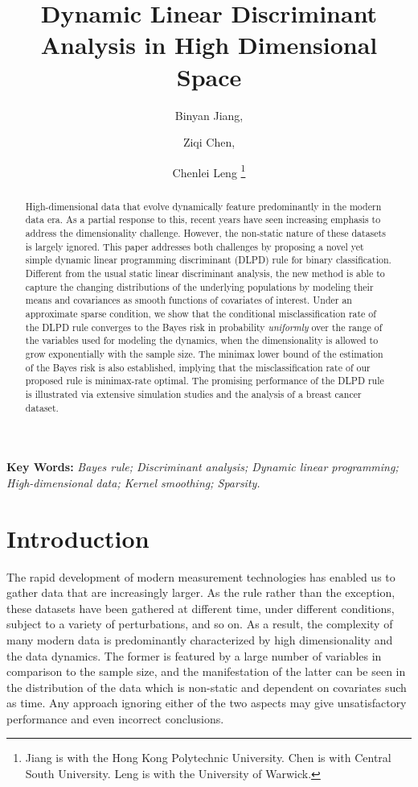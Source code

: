 \documentclass[11pt]{article}
\title{Dynamic Linear Discriminant Analysis in High Dimensional Space}
\author{Binyan Jiang, \and Ziqi Chen, \and Chenlei Leng
  \footnote{Jiang is with the Hong Kong Polytechnic University. Chen is with Central South University. Leng is with
    the University of Warwick. %
    }
}
\theoremstyle{definition}
\def\vv{1}
\renewcommand{\baselinestretch}{\vv}
\begin{document}
 \renewcommand{\baselinestretch}{1.2}

\maketitle

\begin{abstract}
High-dimensional data that evolve dynamically feature predominantly in the modern data era.  As a partial response to this,
recent years have seen increasing emphasis to
address the dimensionality challenge. However, the non-static nature of these datasets is largely
ignored. This paper addresses both challenges by proposing a novel yet simple dynamic linear
programming discriminant (DLPD) rule for binary classification. Different from the usual static linear discriminant analysis, the new method is able to capture the changing distributions of the underlying populations by modeling their means and covariances as smooth functions of covariates of interest. Under an approximate sparse condition, we show that the conditional misclassification rate of the DLPD rule converges to the Bayes risk in probability {\it uniformly} over the range of the variables used for modeling the dynamics, when the dimensionality is allowed to grow exponentially with the sample size. The minimax lower bound of the estimation of the Bayes risk is also established, implying that the misclassification rate of our proposed rule is minimax-rate optimal. The promising performance of the DLPD rule is illustrated via extensive simulation studies and the analysis of a breast cancer dataset.
\end{abstract}

\noindent
{\bf Key Words:} 
{\it Bayes rule; Discriminant analysis; Dynamic linear programming; High-dimensional data; Kernel smoothing; Sparsity.}

 
 \section{Introduction}
 The rapid development of modern measurement technologies has enabled us to gather data that are increasingly larger. As the rule rather than the exception, these datasets have been gathered at different time,  under different conditions, subject to a variety of perturbations, and so on. As a result,
 the complexity of many modern data is predominantly characterized by high dimensionality and the data dynamics. The former is featured by a large number of variables in comparison to the sample size, and the manifestation of the latter can be seen in the distribution of the data which is non-static and dependent on covariates such as time. Any approach ignoring either of the two aspects may give unsatisfactory performance and even incorrect conclusions.
 
\end{document}
